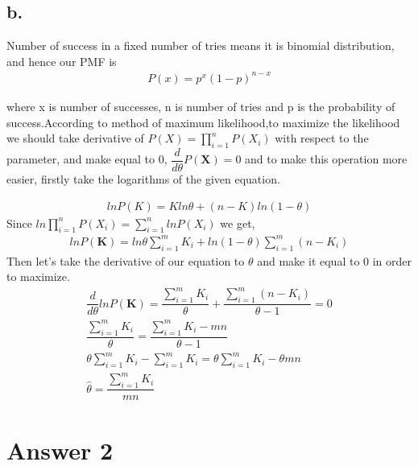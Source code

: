 \documentclass[12pt]{article}
\begin{document}
\subsection*{b.}
Number of success in a fixed number of tries means it is binomial distribution, and hence our PMF is 
\begin{gather*}
    P(x) = p^x(1-p)^{n-x}
\end{gather*}

where x is number of successes, n is number of tries and p is the probability of success.According to method of maximum likelihood,to maximize the likelihood we should take derivative of $P(X) = \prod^n_{i=1} P(X_i)$ with respect to the parameter, and make equal to 0, $\dfrac{d}{d\theta}P(\textbf{X}) = 0$ and to make this operation more easier, firstly take the logarithms of the given equation. 

\begin{gather*}
   lnP(K) = Kln\theta + (n-K)ln(1-\theta)
\end{gather*}
Since $ln\prod_{i=1}^{n}P(X_i)=\sum_{i=1}^n lnP(X_i)$ we get,
\begin{gather*}
    lnP(\textbf{K}) =ln\theta \sum_{i=1}^m K_i +ln(1-\theta) \sum_{i=1}^m (n-K_i)
\end{gather*}
Then let's take the derivative of our equation to $\theta$ and make it equal to 0 in order to maximize.
\begin{gather*}
    \dfrac{d}{d\theta}lnP(\textbf{K}) = \dfrac{\sum_{i=1}^m K_i}{\theta} + \dfrac{\sum_{i=1}^m (n-K_i)}{\theta -1} = 0 \\
    \dfrac{\sum_{i=1}^m K_i}{\theta} = \dfrac{\sum_{i=1}^m K_i -mn}{\theta -1} \\
    \theta \sum_{i=1}^m K_i - \sum_{i=1}^m K_i = \theta \sum_{i=1}^m K_i - \theta mn \\
   \hat{\theta} = \dfrac{\sum_{i=1}^m K_i}{mn}
\end{gather*}
\section*{Answer 2}
\end{document}
